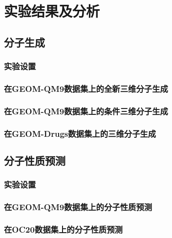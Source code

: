 \chapter[实验结果及分析]{实验结果及分析}
\label{chap:experiment}

\section{分子生成}

\subsection{实验设置}

\subsection{在GEOM-QM9数据集上的全新三维分子生成}

\subsection{在GEOM-QM9数据集上的条件三维分子生成}

\subsection{在GEOM-Drugs数据集上的三维分子生成}

\section{分子性质预测}

\subsection{实验设置}

\subsection{在GEOM-QM9数据集上的分子性质预测}

\subsection{在OC20数据集上的分子性质预测}
